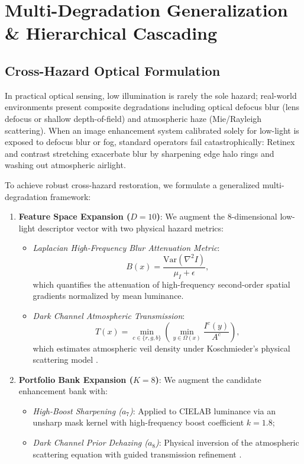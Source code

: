\documentclass[journal]{IEEEtran}
\begin{document}
\section{Multi-Degradation Generalization \& Hierarchical Cascading}

\subsection{Cross-Hazard Optical Formulation}
In practical optical sensing, low illumination is rarely the sole hazard; real-world environments present composite degradations including optical defocus blur (lens defocus or shallow depth-of-field) and atmospheric haze (Mie/Rayleigh scattering). When an image enhancement system calibrated solely for low-light is exposed to defocus blur or fog, standard operators fail catastrophically: Retinex and contrast stretching exacerbate blur by sharpening edge halo rings and washing out atmospheric airlight.

To achieve robust cross-hazard restoration, we formulate a generalized multi-degradation framework:
\begin{enumerate}
    \item \textbf{Feature Space Expansion ($D=10$)}: We augment the 8-dimensional low-light descriptor vector with two physical hazard metrics:
    \begin{itemize}
        \item \textit{Laplacian High-Frequency Blur Attenuation Metric}:
        \begin{equation}
        B(x) = \frac{\text{Var}(\nabla^2 I)}{\mu_I + \epsilon},
        \end{equation}
        which quantifies the attenuation of high-frequency second-order spatial gradients normalized by mean luminance.
        \item \textit{Dark Channel Atmospheric Transmission}:
        \begin{equation}
        T(x) = \min_{c \in \{r, g, b\}} \left( \min_{y \in \Omega(x)} \frac{I^c(y)}{A^c} \right),
        \end{equation}
        which estimates atmospheric veil density under Koschmieder's physical scattering model \cite{koschmieder1924theorie, he2011single}.
    \end{itemize}
    \item \textbf{Portfolio Bank Expansion ($K=8$)}: We augment the candidate enhancement bank with:
    \begin{itemize}
        \item \textit{High-Boost Sharpening ($a_7$)}: Applied to CIELAB luminance via an unsharp mask kernel with high-frequency boost coefficient $k=1.8$;
        \item \textit{Dark Channel Prior Dehazing ($a_8$)}: Physical inversion of the atmospheric scattering equation with guided transmission refinement \cite{he2011single}.
    \end{itemize}
\end{enumerate}
\end{document}
